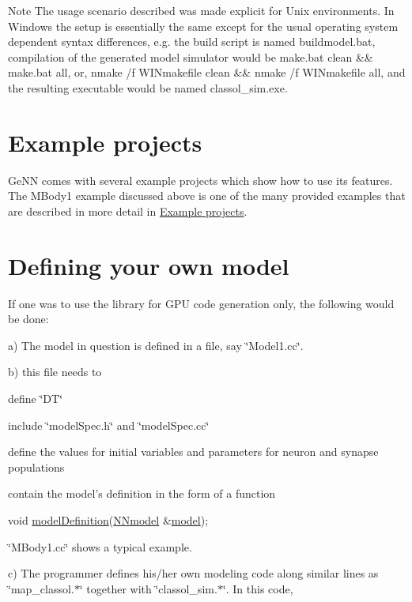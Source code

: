 \begin{DoxyNote}{Note}
The usage scenario described was made explicit for Unix environments. In Windows the setup is essentially the same except for the usual operating system dependent syntax differences, e.\+g. the build script is named buildmodel.\+bat, compilation of the generated model simulator would be {\ttfamily make.\+bat clean \&\& make.\+bat all}, or, {\ttfamily nmake /f W\+I\+Nmakefile clean \&\& nmake /f W\+I\+Nmakefile all}, and the resulting executable would be named {\ttfamily classol\+\_\+sim.\+exe}.
\end{DoxyNote}
\hypertarget{1_quickstart_exs}{}\section{Example projects}\label{1_quickstart_exs}
Ge\+N\+N comes with several example projects which show how to use its features. The M\+Body1 example discussed above is one of the many provided examples that are described in more detail in \hyperlink{}{Example projects}.\hypertarget{1_quickstart_ownmodel}{}\section{Defining your own model}\label{1_quickstart_ownmodel}
If one was to use the library for G\+P\+U code generation only, the following would be done\+:

a) The model in question is defined in a file, say \char`\"{}\+Model1.\+cc\char`\"{}.

b) this file needs to 
\begin{DoxyEnumerate}
\item define \char`\"{}\+D\+T\char`\"{} 
\item include \char`\"{}model\+Spec.\+h\char`\"{} and \char`\"{}model\+Spec.\+cc\char`\"{} 
\item define the values for initial variables and parameters for neuron and synapse populations 
\item contain the model's definition in the form of a function 
\begin{DoxyCode}
\textcolor{keywordtype}{void} \hyperlink{tmp_2model_2MBody__userdef_8cc_a9aeaa0a22980484b2c472564fc9f686e}{modelDefinition}(\hyperlink{classNNmodel}{NNmodel} &\hyperlink{README_8txt_a69fd801b7213948c12d9dd7eebb3ed14}{model}); 
\end{DoxyCode}
 \char`\"{}\+M\+Body1.\+cc\char`\"{} shows a typical example. 
\end{DoxyEnumerate}c) The programmer defines his/her own modeling code along similar lines as \char`\"{}map\+\_\+classol.$\ast$\char`\"{} together with \char`\"{}classol\+\_\+sim.$\ast$\char`\"{}. In this code,


